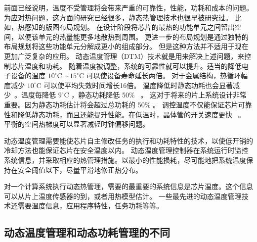 前面已经说明，温度不受管理将会带来严重的可靠性，性能，功耗和成本的问题。
为应对热问题，这方面的研究已经很多，静态热管理技术也很早被研究过。
比如，热感知的版图布局规划。
在设计阶段将芯片的最热的功能单元之间留出空间，以便该单元的热量能更多地散热到周围。
更进一步的布局规划是通过独特的布局规划将这些功能单元分解成更小的组成部分。
但是这种方法并不适用于现在更加广泛复杂的应用。
动态温度管理（DTM）技术就是用来解决上述问题，来控制芯片温度和功耗。
随着温度被调整，系统的可靠性就可以提升。适当的降低电子设备的温度 $10^{\circ}$C $\sim 15^{\circ}$C 可以使设备寿命延长两倍。
对于金属结构，热循环幅度减少 $10^{\circ}$C 可以使平均失效时间增长16倍。
温度降低时静态功耗也会显著减少~。温度每降低 $9^{\circ}$C ，静态功耗降低 50\%~ 。
这对于将来的片上系统设计非常重要。因为静态功耗估计将会超过总功耗的 50\% 。
调控温度不仅能保证芯片可靠性和降低静态功耗，而且还能提升性能。在低温时，晶体管的开关速度更快~ 。
平衡的空间热梯度可以显著减轻时钟偏移问题。

动态温度管理需要能使芯片自主修改任务的执行和功耗特性的技术，以使低开销的冷却方法也能保证芯片在安全温度以内。
动态温度管理控制器在系统运行时监控系统信息，并采取相应的热管理措施。以最小的性能损耗，尽可能地把系统温度保持在安全阈值以下，尽量平滑地修正热分布。

对一个计算系统执行动态热管理，需要的最重要的系统信息是芯片温度。这个信息可以从片上温度传感器的到，或者用热模型估计。
一些最先进的动态温度管理技术还需要温度信息，应用程序特性，任务功耗等等。

\subsection{动态温度管理和动态功耗管理的不同}\label{sec:DPM}

